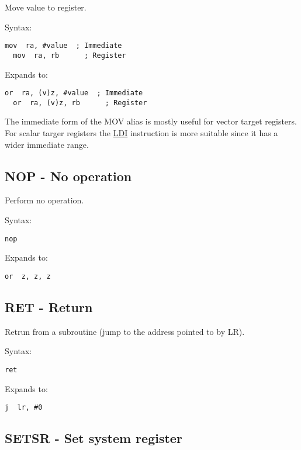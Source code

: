 Move value to register.

Syntax:
\begin{lstlisting}[style=assembler]
  mov  ra, #value  ; Immediate
  mov  ra, rb      ; Register
\end{lstlisting}

Expands to:
\begin{lstlisting}[style=assembler]
  or  ra, (v)z, #value  ; Immediate
  or  ra, (v)z, rb      ; Register
\end{lstlisting}

\begin{notebox}
The immediate form of the MOV alias is mostly useful for vector target
registers. For scalar targer registers the \hyperref[insn:LDI]{LDI} instruction
is more suitable since it has a wider immediate range.
\end{notebox}

\subsection{NOP - No operation}
\label{insn:NOP}

Perform no operation.

Syntax:
\begin{lstlisting}[style=assembler]
  nop
\end{lstlisting}

Expands to:
\begin{lstlisting}[style=assembler]
  or  z, z, z
\end{lstlisting}

\subsection{RET - Return}
\label{insn:RET}

Retrun from a subroutine (jump to the address pointed to by LR).

Syntax:
\begin{lstlisting}[style=assembler]
  ret
\end{lstlisting}

Expands to:
\begin{lstlisting}[style=assembler]
  j  lr, #0
\end{lstlisting}

\subsection{SETSR - Set system register}
\label{insn:SETSR}

